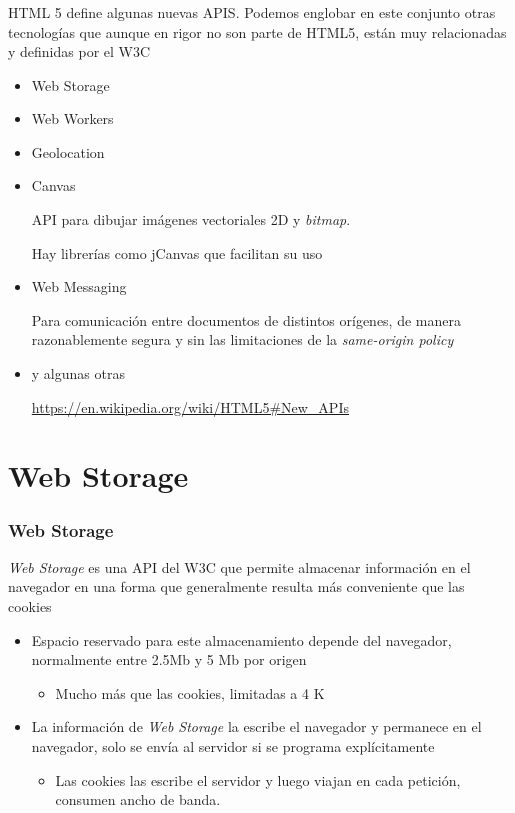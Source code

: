 \documentclass[ucs]{beamer}
\begin{document}
\begin{frame}[fragile]
\frametitle{}
HTML 5 define algunas nuevas APIS. Podemos englobar en este conjunto
otras tecnologías que aunque en rigor no son parte de HTML5,
están muy relacionadas y definidas por el W3C 
\begin{itemize}
\item
Web Storage
\item
Web Workers
\item
Geolocation
\item
Canvas

API para dibujar imágenes vectoriales 2D y 
\emph{bitmap}. 

Hay librerías como jCanvas que facilitan su uso

\item
Web Messaging 

Para comunicación entre documentos de distintos orígenes, de manera
razonablemente segura y sin las limitaciones de la
\emph{same-origin policy}

\item
y algunas otras

\url{https://en.wikipedia.org/wiki/HTML5#New_APIs}
\end{itemize}

\end{frame}




\section{Web Storage}
\begin{frame}[fragile]
\frametitle{Web Storage}


\emph{Web Storage}
 es una API del W3C que permite almacenar información en el navegador 
en una forma que 
generalmente resulta más conveniente que las cookies


\begin{itemize}
\item
Espacio reservado para este almacenamiento depende del navegador, normalmente
entre 2.5Mb y 5 Mb por origen 

    \begin{itemize}
    \item
Mucho más que las cookies, limitadas a 4 K
    \end{itemize}

\item

La información de 
\emph{Web Storage} 
la escribe el navegador y permanece en el navegador, solo se envía al servidor
si se programa explícitamente

    \begin{itemize}
    \item
Las cookies las escribe el servidor y luego viajan en cada petición,
consumen ancho de banda. 
    \end{itemize}
\end{itemize}
\end{frame}
\end{document}
